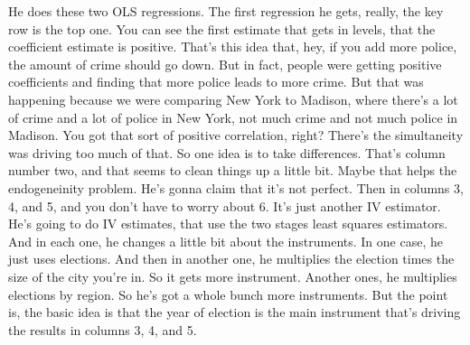 \documentclass[11pt,a4paper]{amsart}
\theoremstyle{plain}
\theoremstyle{definition}
\begin{document}
 		  He does these two OLS regressions. The first regression he gets, really, the key row is the top one. You can see the first estimate that gets in levels, that the coefficient estimate is positive. That's this idea that, hey, if you add more police, the amount of crime should go down. But in fact, people were getting positive coefficients and finding that more police leads to more crime. But that was happening because we were comparing New York to Madison, where there's a lot of crime and a lot of police in New York, not much crime and not much police in Madison. You got that sort of positive correlation, right? There's the simultaneity was driving too much of that. So one idea is to take differences. That's column number two, and that seems to clean things up a little bit. Maybe that helps the endogeneinity problem. He's gonna claim that it's not perfect. Then in columns 3, 4, and 5, and you don't have to worry about 6. It's just another IV estimator. He's going to do IV estimates,  that use the two stages least squares estimators. And in each one, he changes a little bit about the instruments. In one case, he just uses elections. And then in another one, he multiplies the election times the size of the city you're in. So it gets more instrument. Another ones, he multiplies elections by region. So he's got a whole bunch more instruments. But the point is, the basic idea is that the year of election is the main instrument that's driving the results in columns 3, 4, and 5.\par 
\end{document}
